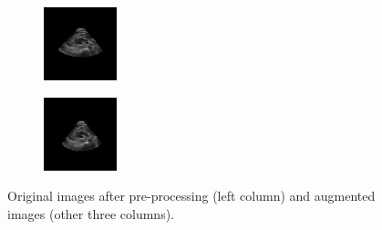 \begin{figure}[htb]
\begin{subfigure}[b]{0.245\textwidth}
        \end{subfigure}%
        \begin{subfigure}[b]{0.245\textwidth}
                \centering
                \includegraphics[width=\linewidth]{img_seg/286_post}
        \end{subfigure}%
        \begin{subfigure}[b]{0.245\textwidth}
                \centering
                \includegraphics[width=\linewidth]{img_seg/288_post}
        \end{subfigure}
        \caption{Original images after pre-processing (left column) and augmented images (other three columns).}
        \label{fig:data_aug}
\end{figure}


